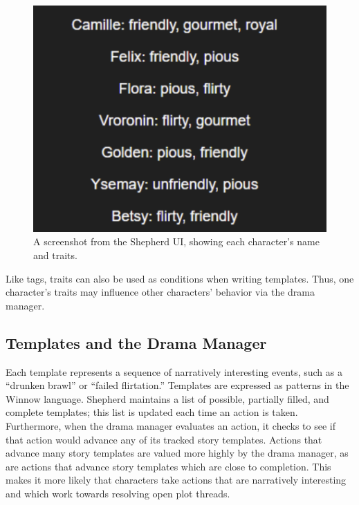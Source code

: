 \documentclass[letterpaper]{article}
\begin{document}
\begin{figure}[h]
    \centering
    \includegraphics[width=\columnwidth]{figure-traits}
    \caption{A screenshot from the Shepherd UI, showing each character's name and traits.}
    \label{fig:traits}
\end{figure}


Like tags, traits can also be used as conditions when writing templates. Thus, one
character's traits may influence other characters' behavior via the drama manager.

\subsection{Templates and the Drama Manager}
Each template represents a sequence of narratively interesting events, such as a ``drunken
brawl'' or ``failed flirtation.'' Templates are expressed as patterns in the Winnow
language. Shepherd maintains a list of possible, partially filled, and complete templates;
this list is updated each time an action is taken. Furthermore, when the drama manager
evaluates an action, it checks to see if that action would advance any of its tracked
story templates. Actions that advance many story templates are valued more highly by the
drama manager, as are actions that advance story templates which are close to completion.
This makes it more likely that characters take actions that are narratively interesting
and which work towards resolving open plot threads.

\end{document}
